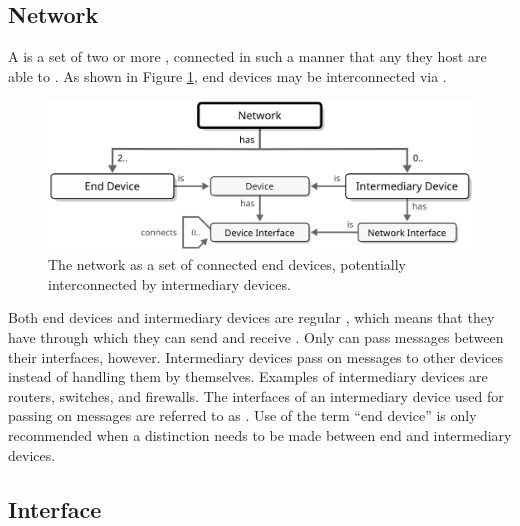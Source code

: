 \subsection{Network}
\label{sec:reference-model:network}

A  is a set of two or more , connected in such a manner that any  they host are able to .
As shown in Figure \ref{fig:network}, end devices may be interconnected via .

\begin{figure}[ht!]
  \centering
  \includegraphics[scale=0.9]{figures/network}
  \caption{
    The network as a set of connected end devices, potentially interconnected by intermediary devices.
  }
  \label{fig:network}
\end{figure}

Both end devices and intermediary devices are regular , which means that they have  through which they can send and receive .
Only  can pass messages between their interfaces, however.
Intermediary devices pass on messages to other devices instead of handling them by themselves.
Examples of intermediary devices are routers, switches, and firewalls.
The interfaces of an intermediary device used for passing on messages are referred to as .
Use of the term ``end device'' is only recommended when a distinction needs to be made between end and intermediary devices.

\subsection{Interface}
\label{sec:reference-model:interface}

